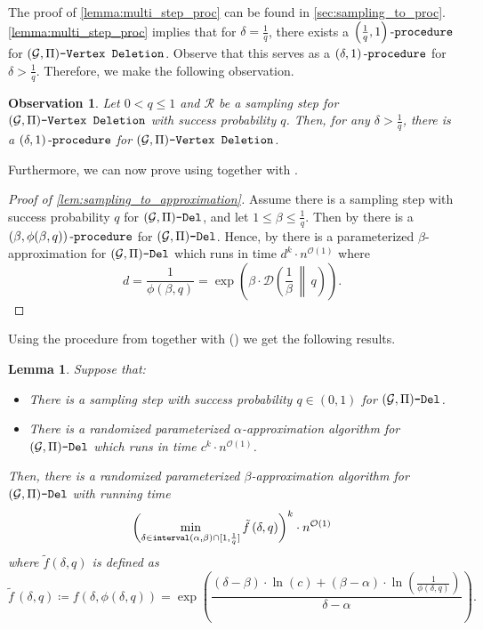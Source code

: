\documentclass[letterpaper,11pt]{article}
\newcommand{\1}[1]{\mathds{1}\left[#1\right]}
\newcommand{\D}[2]{\mathcal{D}\left(#1\, \middle\|\,#2 \right)}
\newcommand{\Oh}{\mathcal{O}}
\newcommand{\goodd}{\textnormal{\texttt{interval}}(\alpha, \beta)}
\newcommand{\proc}[2]{\left( #1, #2 \right)\textnormal{-\texttt{procedure}}}
\newtheorem{lemma}[theorem]{Lemma}
\newtheorem{observation}[theorem]{Observation}
\newcommand{\gpivd}[1][\mathcal{G},\Pi]{(#1)\textnormal{\texttt{-Vertex Deletion}}}
\newcommand{\sgpivd}[1][\mathcal{G},\Pi]{(#1)\textnormal{\texttt{-Del}}}
\begin{document}
The proof of \cref{lemma:multi_step_proc} can be found in \cref{sec:sampling_to_proc}.
\cref{lemma:multi_step_proc} implies that for $\delta = \frac{1}{q}$,
 there exists a
$\proc{\frac{1}{q}}{1}$ for $\gpivd$.
Observe that this serves as a $\proc{\delta}{1}$
for $\delta > \frac{1}{q}$.
Therefore, we make the following observation.


\begin{observation}\label{observation:delta_1_proc}
	Let $0 < q \leq 1$ and $\mathcal{R}$ be a sampling step for $\gpivd$ with success
	probability $q$. Then, for any $\delta > \frac{1}{q}$,  there is a
	$\proc{\delta}{1}$ for $\gpivd$.
\end{observation}

Furthermore, we can now prove  using    together with  .
\begin{proof}[Proof of \cref{lem:sampling_to_approximation}]
	Assume there is a sampling step with success probability $q$ for $\sgpivd$, and let $1\leq \beta\leq \frac{1}{q}$. Then by  there is a $\proc{\beta}{\phi(\beta,q)}$ for $\sgpivd$. Hence, by  there is a parameterized $\beta$-approximation for $\sgpivd$ which runs in time $d^k\cdot n^{\Oh(1)}$ where 
	$$
	d=\frac{1}{\phi(\beta,q)} = \exp\left(\beta\cdot \D{\frac{1}{\beta}}{q} \right).
	$$
\end{proof}



Using  the procedure from  together with  () we get the following results. 
\begin{lemma}\label{lemma:approx_sampling}
	Suppose that:
	\begin{itemize}
		\item There is a sampling step with success probability $q\in(0,1)$ for $\sgpivd$.
		\item There is a randomized parameterized $\alpha$-approximation algorithm for $\sgpivd$ which runs in time $c^{k}\cdot n^{\Oh(1)}$. 
	\end{itemize}
	Then,  there is a randomized parameterized
	$\beta$-approximation algorithm for $\sgpivd$ with running time
	\begin{equation*}
		\biggl(\min_{\delta \in \goodd \cap [1, \frac{1}{q}]}\tilde{f}\,(\delta, q)\biggr)^{k} \cdot n^{\Oh(1)}
	\end{equation*}
	where $\tilde{f}(\delta ,q)$ is defined as
\begin{equation*}
	\tilde{f}\,(\delta, q) \coloneqq  f(\delta,\phi(\delta,q) )=\exp\left( \frac{(\delta - \beta) \cdot \ln(c) + (\beta - \alpha) \cdot \ln\left( \frac{1}{\phi(\delta, q)} \right)  }{\delta - \alpha} \right).
\end{equation*}
\end{lemma}
\end{document}
